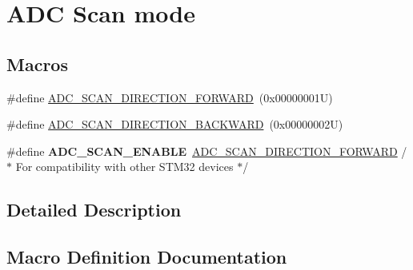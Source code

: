 \hypertarget{group___a_d_c___scan__mode}{}\section{A\+DC Scan mode}
\label{group___a_d_c___scan__mode}
\subsection*{Macros}
\begin{DoxyCompactItemize}
\item 
\#define \hyperlink{group___a_d_c___scan__mode_ga68fdaadb92f6293fc63cdeefd0c93a4f}{A\+D\+C\+\_\+\+S\+C\+A\+N\+\_\+\+D\+I\+R\+E\+C\+T\+I\+O\+N\+\_\+\+F\+O\+R\+W\+A\+RD}~(0x00000001\+U)
\item 
\#define \hyperlink{group___a_d_c___scan__mode_gae160445e1a005fba64d739c321ae61b9}{A\+D\+C\+\_\+\+S\+C\+A\+N\+\_\+\+D\+I\+R\+E\+C\+T\+I\+O\+N\+\_\+\+B\+A\+C\+K\+W\+A\+RD}~(0x00000002\+U)
\item 
\mbox{\label{group___a_d_c___scan__mode_ga1e109b8619961829ff2bc368c1725382}} 
\#define {\bfseries A\+D\+C\+\_\+\+S\+C\+A\+N\+\_\+\+E\+N\+A\+B\+LE}~\hyperlink{group___a_d_c___scan__mode_ga68fdaadb92f6293fc63cdeefd0c93a4f}{A\+D\+C\+\_\+\+S\+C\+A\+N\+\_\+\+D\+I\+R\+E\+C\+T\+I\+O\+N\+\_\+\+F\+O\+R\+W\+A\+RD}       /$\ast$ For compatibility with other S\+T\+M32 devices $\ast$/
\end{DoxyCompactItemize}


\subsection{Detailed Description}


\subsection{Macro Definition Documentation}
\mbox{\label{group___a_d_c___scan__mode_gae160445e1a005fba64d739c321ae61b9}} 
